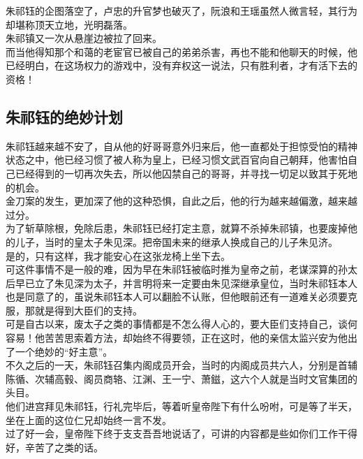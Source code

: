 \begin{multicols}{\theparacolNo}
朱祁钰的企图落空了，卢忠的升官梦也破灭了，阮浪和王瑶虽然人微言轻，其行为却堪称顶天立地，光明磊落。\\

朱祁镇又一次从悬崖边被拉了回来。\\

而当他得知那个和蔼的老宦官已被自己的弟弟杀害，再也不能和他聊天的时候，他已经明白，在这场权力的游戏中，没有弃权这一说法，只有胜利者，才有活下去的资格！\\

\subsection{朱祁钰的绝妙计划}
朱祁钰越来越不安了，自从他的好哥哥意外归来后，他一直都处于担惊受怕的精神状态之中，他已经习惯了被人称为皇上，已经习惯文武百官向自己朝拜，他害怕自己已经得到的一切再次失去，所以他囚禁自己的哥哥，并寻找一切足以致其于死地的机会。\\

金刀案的发生，更加深了他的这种恐惧，自此之后，他的行为越来越偏激，越来越过分。\\

为了斩草除根，免除后患，朱祁钰已经打定主意，就算不杀掉朱祁镇，也要废掉他的儿子，当时的皇太子朱见深。把帝国未来的继承人换成自己的儿子朱见济。\\

是的，只有这样，我才能安心在这张龙椅上坐下去。\\

可这件事情不是一般的难，因为早在朱祁钰被临时推为皇帝之前，老谋深算的孙太后早已立了朱见深为太子，并言明将来一定要由朱见深继承皇位，当时朱祁钰本人也是同意了的，虽说朱祁钰本人可以翻脸不认账，但他眼前还有一道难关必须要克服，那就是得到大臣们的支持。\\

可是自古以来，废太子之类的事情都是不怎么得人心的，要大臣们支持自己，谈何容易！他苦苦思索着方法，却始终不得要领，正在这时，他的亲信太监兴安为他出了一个绝妙的“好主意”。\\

不久之后的一天，朱祁钰召集内阁成员开会，当时的内阁成员共六人，分别是首辅陈循、次辅高毂、阁员商辂、江渊、王一宁、萧鎡，这六个人就是当时文官集团的头目。\\

他们进宫拜见朱祁钰，行礼完毕后，等着听皇帝陛下有什么吩咐，可是等了半天，坐在上面的这位仁兄却始终一言不发。\\

过了好一会，皇帝陛下终于支支吾吾地说话了，可讲的内容都是些如你们工作干得好，辛苦了之类的话。\\


\end{multicols}
